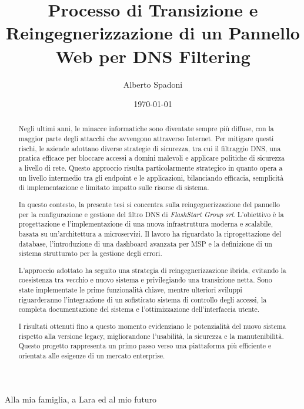 \documentclass[12pt,a4paper,openright,twoside]{book}
\title{Processo di Transizione e Reingegnerizzazione di un Pannello Web per DNS Filtering}
\author{Alberto Spadoni}
\date{\today}
\begin{document}
\frontmatter\frontispiece

\renewcommand{\abstractname}{Abstract} %

\begin{abstract}
  Negli ultimi anni, le minacce informatiche sono diventate sempre più diffuse, con la maggior parte degli attacchi che avvengono attraverso Internet. Per mitigare questi rischi, le aziende adottano diverse strategie di sicurezza, tra cui il filtraggio DNS, una pratica efficace per bloccare accessi a domini malevoli e applicare politiche di sicurezza a livello di rete. Questo approccio risulta particolarmente strategico in quanto opera a un livello intermedio tra gli endpoint e le applicazioni, bilanciando efficacia, semplicità di implementazione e limitato impatto sulle risorse di sistema.

  \medskip

  In questo contesto, la presente tesi si concentra sulla reingegnerizzazione del pannello per la configurazione e gestione del filtro DNS di \textit{FlashStart Group srl}. L'obiettivo è la progettazione e l’implementazione di una nuova infrastruttura moderna e scalabile, basata su un’architettura a microservizi. Il lavoro ha riguardato la riprogettazione del database, l’introduzione di una dashboard avanzata per MSP e la definizione di un sistema strutturato per la gestione degli errori.

  \medskip

  L’approccio adottato ha seguito una strategia di reingegnerizzazione ibrida, evitando la coesistenza tra vecchio e nuovo sistema e privilegiando una transizione netta. Sono state implementate le prime funzionalità chiave, mentre ulteriori sviluppi riguarderanno l’integrazione di un sofisticato sistema di controllo degli accessi, la completa documentazione del sistema e l’ottimizzazione dell’interfaccia utente.

  \medskip

  I risultati ottenuti fino a questo momento evidenziano le potenzialità del nuovo sistema rispetto alla versione legacy, migliorandone l’usabilità, la sicurezza e la manutenibilità. Questo progetto rappresenta un primo passo verso una piattaforma più efficiente e orientata alle esigenze di un mercato enterprise.
\end{abstract}

\begin{dedication} %
  Alla mia famiglia, a Lara ed al mio futuro
\end{dedication}
\end{document}
